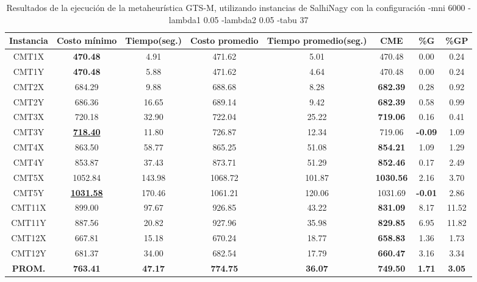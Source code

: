 \begin{table}[h]
\caption{Resultados de la ejecución de la metaheurística GTS-M, utilizando instancias de SalhiNagy con la configuración -mni 6000 -lambda1 0.05 -lambda2 0.05 -tabu 37}
\centering
\small
\begin{tabular}{c c c c c c c c}
\hline\hline
Instancia & Costo mínimo & Tiempo(seg.) & Costo promedio & Tiempo promedio(seg.) & CME & \%G & \%GP \\ [0.5ex]
\hline
CMT1X & \bf{470.48} & 4.91 & 
471.62 & 5.01 & 470.48 & 0.00
 & 0.24\\CMT1Y & \bf{470.48} & 5.88 & 
471.62 & 4.64 & 470.48 & 0.00
 & 0.24\\CMT2X & 684.29 & 9.88 & 
688.68 & 8.28 & \bf{682.39} & 
0.28 & 0.92\\CMT2Y & 686.36 & 16.65 & 
689.14 & 9.42 & \bf{682.39} & 
0.58 & 0.99\\CMT3X & 720.18 & 32.90 & 
722.04 & 25.22 & \bf{719.06} & 
0.16 & 0.41\\CMT3Y & \bf{\underline{718.40}} & 11.80 & 
726.87 & 12.34 & 719.06 & 
\bf{-0.09} & 1.09\\CMT4X & 863.50 & 58.77 & 
865.25 & 51.08 & \bf{854.21} & 
1.09 & 1.29\\CMT4Y & 853.87 & 37.43 & 
873.71 & 51.29 & \bf{852.46} & 
0.17 & 2.49\\CMT5X & 1052.84 & 143.98 & 
1068.72 & 101.87 & \bf{1030.56} & 
2.16 & 3.70\\CMT5Y & \bf{\underline{1031.58}} & 170.46 & 
1061.21 & 120.06 & 1031.69 & 
\bf{-0.01} & 2.86\\CMT11X & 899.00 & 97.67 & 
926.85 & 43.22 & \bf{831.09} & 
8.17 & 11.52\\CMT11Y & 887.56 & 20.82 & 
927.96 & 35.98 & \bf{829.85} & 
6.95 & 11.82\\CMT12X & 667.81 & 15.18 & 
670.24 & 18.77 & \bf{658.83} & 
1.36 & 1.73\\CMT12Y & 681.37 & 34.00 & 
682.54 & 17.79 & \bf{660.47} & 
3.16 & 3.34\\\bf{PROM.} & 
\bf{763.41} & \bf{47.17} & \bf{774.75} & \bf{36.07} & \bf{749.50} & \bf{1.71} & \bf{3.05}\\[1ex]\hline
\end{tabular}
\label{table:nonlin}
\end{table} 
